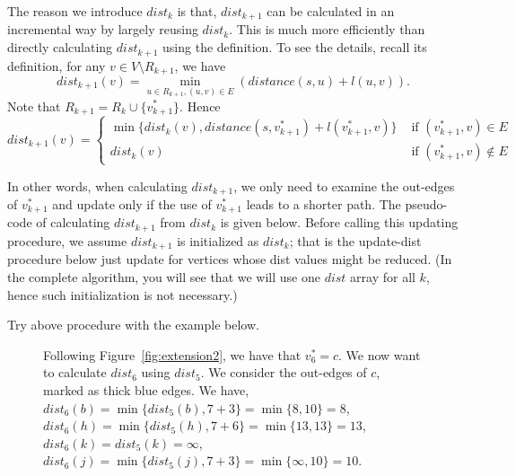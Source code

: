 The reason we introduce $dist_k$ is that, $dist_{k+1}$ can be calculated 
in an incremental way by largely reusing $dist_k$.
This is much more efficiently than directly calculating $dist_{k+1}$ using the definition. 
To see the details, recall its definition, for any $v\in V\setminus R_{k+1}$, we have 
$$dist_{k+1}(v) = \textstyle \min_{u\in R_{k+1}, (u, v)\in E} (distance(s, u) + l(u,v)).$$
Note that $R_{k+1} = R_k \cup \{v_{k+1}^*\}$. Hence
\begin{displaymath}
dist_{k+1}(v) = \left\{
\begin{array}{llllll}
\min\{ dist_k(v), distance(s, v_{k+1}^*) + l(v_{k+1}^*, v) \} & \textrm{ if } (v_{k+1}^*, v) \in E \\
dist_k(v) & \textrm{ if } (v_{k+1}^*, v) \not\in E
\end{array}
\right.
\end{displaymath}

In other words, when calculating $dist_{k+1}$, we only need to examine the out-edges of $v_{k+1}^*$
and update only if the use of $v_{k+1}^*$ leads to a shorter path. The pseudo-code of
calculating $dist_{k+1}$ from $dist_k$ is given below.
Before calling this updating procedure, we assume $dist_{k+1}$ is initialized as $dist_k$;
that is the update-dist procedure below just update for vertices whose dist values might be reduced.
(In the complete algorithm, you will see that we will use one $dist$ array for all $k$, hence such initialization is not necessary.)

\begin{algorithmblock}[0.8\textwidth]
	\xxx
	\xxx
	\xxx
	\xxx
\end{algorithmblock}

Try above procedure with the example below.

\begin{figure}[h!]
\centering{}
\caption{Following Figure~\ref{fig:extension2}, we have that $v_6^* = c$.
We now want to calculate $dist_6$ using $dist_5$. We consider the out-edges of $c$, marked as thick blue edges.
We have, 
$dist_6(b) = \min\{dist_5(b), 7 + 3\}= \min\{8, 10\} = 8$, 
$dist_6(h) = \min\{dist_5(h), 7 + 6\}= \min\{13, 13\} = 13$, 
$dist_6(k) = dist_5(k) = \infty$, 
$dist_6(j) = \min\{dist_5(j), 7 + 3\}= \min\{\infty, 10\} = 10$.  }
\label{fig:update}
\end{figure}

